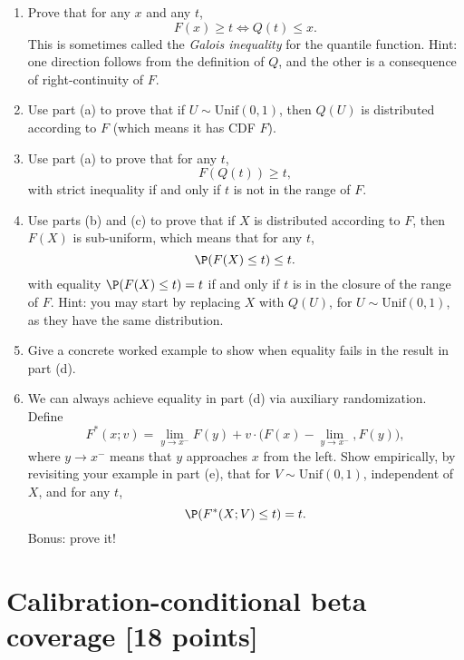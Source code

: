 \documentclass{article}
\begin{document}
\begin{enumerate}[label=(\alph*)]
\item Prove that for any $x$ and any $t$, 
  \marginpar{\small [3 pts]}
  \[
  F(x) \geq t \iff Q(t) \leq x.
  \]
  This is sometimes called the \emph{Galois inequality} for the quantile
  function. Hint: one direction follows from the definition of $Q$, and the
  other is a consequence of right-continuity of $F$.  

\item Use part (a) to prove that if $U \sim \mathrm{Unif}(0,1)$, then $Q(U)$ is
  distributed according to $F$ (which means it has CDF $F$).
  \marginpar{\small [2 pts]}

\item Use part (a) to prove that for any $t$, 
  \marginpar{\small [2 pts]}
  \[
  F(Q(t)) \geq t,
  \]
  with strict inequality if and only if $t$ is not in the range of $F$. 

\item Use parts (b) and (c) to prove that if $X$ is distributed according to
  $F$, then $F(X)$ is sub-uniform, which means that for any $t$, 
  \marginpar{\small [3 pts]}
  \[
  \P(F(X) \leq t) \leq t.
  \]
  with equality $\P(F(X) \leq t) = t$ if and only if $t$ is in the closure of
  the range of $F$. Hint: you may start by replacing $X$ with $Q(U)$, for $U
  \sim \mathrm{Unif}(0,1)$, as they have the same distribution.  
  
\item Give a concrete worked example to show when equality fails in the result  
  in part (d).
  \marginpar{\small [2 pts]}

\item We can always achieve equality in part (d) via auxiliary randomization.
  Define
  \[
  F^*(x; v) =  \lim_{y \to x^-} F(y) + v \cdot \Big( F(x) - \lim_{y \to x^-},
  F(y) \Big),
  \]
  where $y \to x^-$ means that $y$ approaches $x$ from the left. Show
  empirically, by revisiting your example in part (e), that for $V \sim
  \mathrm{Unif}(0,1)$, independent of $X$, and for any $t$,      
  \marginpar{\small [2 pts]}
  \[
  \P(F^*(X; V) \leq t) = t.
  \]
  Bonus: prove it!
\end{enumerate}

\section{Calibration-conditional beta coverage [18 points]}

\def\hC{\hat{C}}
\end{document}
